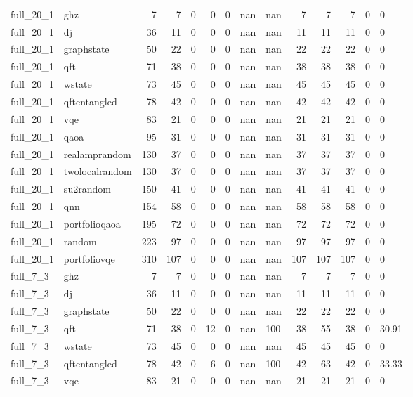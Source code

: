 \begin{longtable}{llrrrrrllrrrll}
full\_20\_1 & ghz & 7 & 7 & 0 & 0 & 0 & nan & nan & 7 & 7 & 7 & 0 & 0 \\
full\_20\_1 & dj & 36 & 11 & 0 & 0 & 0 & nan & nan & 11 & 11 & 11 & 0 & 0 \\
full\_20\_1 & graphstate & 50 & 22 & 0 & 0 & 0 & nan & nan & 22 & 22 & 22 & 0 & 0 \\
full\_20\_1 & qft & 71 & 38 & 0 & 0 & 0 & nan & nan & 38 & 38 & 38 & 0 & 0 \\
full\_20\_1 & wstate & 73 & 45 & 0 & 0 & 0 & nan & nan & 45 & 45 & 45 & 0 & 0 \\
full\_20\_1 & qftentangled & 78 & 42 & 0 & 0 & 0 & nan & nan & 42 & 42 & 42 & 0 & 0 \\
full\_20\_1 & vqe & 83 & 21 & 0 & 0 & 0 & nan & nan & 21 & 21 & 21 & 0 & 0 \\
full\_20\_1 & qaoa & 95 & 31 & 0 & 0 & 0 & nan & nan & 31 & 31 & 31 & 0 & 0 \\
full\_20\_1 & realamprandom & 130 & 37 & 0 & 0 & 0 & nan & nan & 37 & 37 & 37 & 0 & 0 \\
full\_20\_1 & twolocalrandom & 130 & 37 & 0 & 0 & 0 & nan & nan & 37 & 37 & 37 & 0 & 0 \\
full\_20\_1 & su2random & 150 & 41 & 0 & 0 & 0 & nan & nan & 41 & 41 & 41 & 0 & 0 \\
full\_20\_1 & qnn & 154 & 58 & 0 & 0 & 0 & nan & nan & 58 & 58 & 58 & 0 & 0 \\
full\_20\_1 & portfolioqaoa & 195 & 72 & 0 & 0 & 0 & nan & nan & 72 & 72 & 72 & 0 & 0 \\
full\_20\_1 & random & 223 & 97 & 0 & 0 & 0 & nan & nan & 97 & 97 & 97 & 0 & 0 \\
full\_20\_1 & portfoliovqe & 310 & 107 & 0 & 0 & 0 & nan & nan & 107 & 107 & 107 & 0 & 0 \\
full\_7\_3 & ghz & 7 & 7 & 0 & 0 & 0 & nan & nan & 7 & 7 & 7 & 0 & 0 \\
full\_7\_3 & dj & 36 & 11 & 0 & 0 & 0 & nan & nan & 11 & 11 & 11 & 0 & 0 \\
full\_7\_3 & graphstate & 50 & 22 & 0 & 0 & 0 & nan & nan & 22 & 22 & 22 & 0 & 0 \\
full\_7\_3 & qft & 71 & 38 & 0 & 12 & 0 & nan & 100 & 38 & 55 & 38 & 0 & 30.91 \\
full\_7\_3 & wstate & 73 & 45 & 0 & 0 & 0 & nan & nan & 45 & 45 & 45 & 0 & 0 \\
full\_7\_3 & qftentangled & 78 & 42 & 0 & 6 & 0 & nan & 100 & 42 & 63 & 42 & 0 & 33.33 \\
full\_7\_3 & vqe & 83 & 21 & 0 & 0 & 0 & nan & nan & 21 & 21 & 21 & 0 & 0 \\

\end{longtable}

